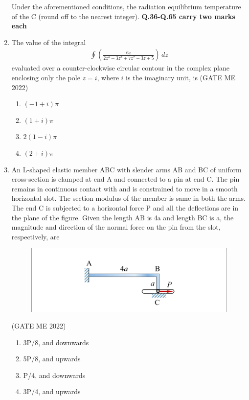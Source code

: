 \documentclass[journal]{IEEEtran}
\numberwithin{equation}{enumi}
\numberwithin{figure}{enumi}
\begin{document}
\begin{enumerate}
Under the aforementioned conditions, the radiation equilibrium temperature of the
C (round off to the nearest integer).
\textbf{Q.36-Q.65 carry two marks each}
\item The value of the integral
\begin{align*}
    \oint \left( \frac{6z}{2z^4 - 3z^3 + 7z^2 - 3z + 5} \right) \, dz
\end{align*}
evaluated over a counter-clockwise circular contour in the complex plane enclosing only the pole $z = i$, where $i$ is the imaginary unit, is
\hfill{(GATE ME 2022)}
\begin{enumerate}
     \item $(-1 + i)\pi$
    \item  $(1 + i)\pi$
    \item $2(1 - i)\pi$
    \item$(2 + i)\pi$
    
\end{enumerate}
\item An L-shaped elastic member ABC with slender arms AB and BC of uniform cross-section is clamped at end A and connected to a pin at end C. The pin remains in continuous contact with and is constrained to move in a smooth horizontal slot. The section modulus of the member is same in both the arms. The end C is subjected to a horizontal force P and all the deflections are in the plane of the figure. Given the length AB is 4a and length BC is a, the magnitude and direction of the normal force on the pin from the slot, respectively, are
\begin{figure}[H]
    \centering
    \includegraphics[width = 0.5\columnwidth]{figs/fig4.11.png}
    \caption*{}
    \label{fig:Q38}
    \end{figure}
    \hfill{(GATE ME 2022)}
\begin{enumerate}
    \item 3P/8, and downwards
\item 5P/8, and upwards
\item P/4, and downwards
\item 3P/4, and upwards
\end{enumerate}


\end{enumerate}
\end{document}
